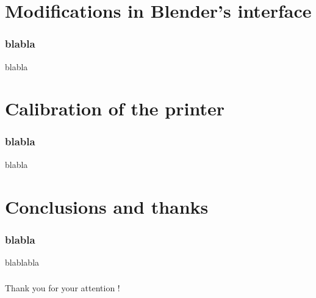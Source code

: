 \documentclass{beamer}
\begin{document}
\section{Modifications in Blender's interface}
\begin{frame}
	\frametitle{blabla}

    \begin{block}{blabla}
    \end{block}
\end{frame}

\section{Calibration of the printer}
\begin{frame}
	\frametitle{blabla}

    \begin{block}{blabla}
    \end{block}
\end{frame}

\section{Conclusions and thanks}
\begin{frame}
	\frametitle{blabla}

    \begin{block}{blablabla}
    \end{block}
\end{frame}

\begin{frame}
	\frametitle{}

    \begin{center}
    \Large{Thank you for your attention !}
    \end{center}
\end{frame}
	
\end{document}
